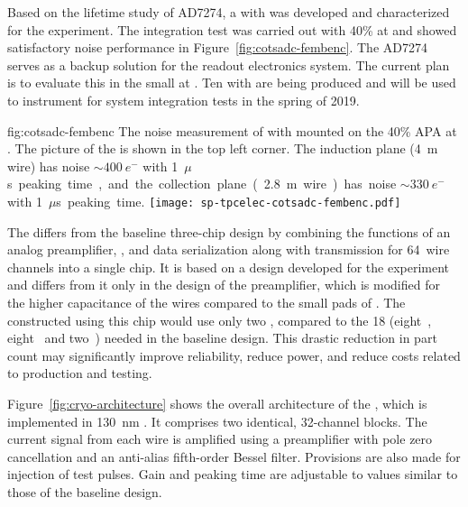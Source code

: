 Based on the lifetime study of AD7274, a  with  
 was developed and characterized for the  experiment. The 
integration test was carried out with 40\%  at  and 
showed satisfactory noise performance in Figure~\ref{fig:cotsadc-fembenc}. 
The   AD7274 serves as a backup solution for the 
   readout electronics system. The current 
plan is to evaluate this  in the small  
 at . Ten  with  
 are being produced and will be used to instrument  
 for system integration tests in the spring of 2019. 

\begin{dunefigure}
{fig:cotsadc-fembenc}
{The noise measurement of  with   
mounted on the \num{40}\% APA at . The picture of the 
 is shown in the top left corner. The induction plane 
(\SI{4}{m} wire) has noise $\sim\SI{400}{e^-}$ with \SI{1}{$\mu$s} 
peaking time, and the collection plane (\SI{2.8}{m} wire) has noise 
$\sim\SI{330}{e^-}$ with \SI{1}{$\mu$s} peaking time.}
\texttt{[image: sp-tpcelec-cotsadc-fembenc.pdf]}
\end{dunefigure}


\label{sec:fdsp-tpcelec-design-femb-alt-cryo}

The    differs from the baseline 
three-chip design by combining the functions of an analog 
preamplifier, , and data serialization along with %
transmission 
for \num{64}~wire channels into a single chip. It is based on a design 
developed for the  experiment~\cite{nEXO} and differs from 
it only in the design of the preamplifier, which is modified for the 
higher capacitance of the   wires compared 
to the small pads of . The  constructed using 
this chip would use only two , compared to the \num{18} 
(eight~, eight~ and two~) needed 
in the baseline design. This drastic reduction in part count may 
significantly improve  reliability, reduce power, and reduce 
costs related to production and testing. 

Figure~\ref{fig:cryo-architecture} shows the overall architecture of 
the  , which is implemented in 
\SI{130}{nm} . It comprises two identical, \num{32}-channel 
blocks. The current signal from each wire is amplified using a preamplifier 
with pole zero cancellation and an anti-alias fifth-order Bessel filter. 
Provisions are also made for injection of test pulses. Gain and peaking 
time are adjustable to values similar to those of the baseline design.

